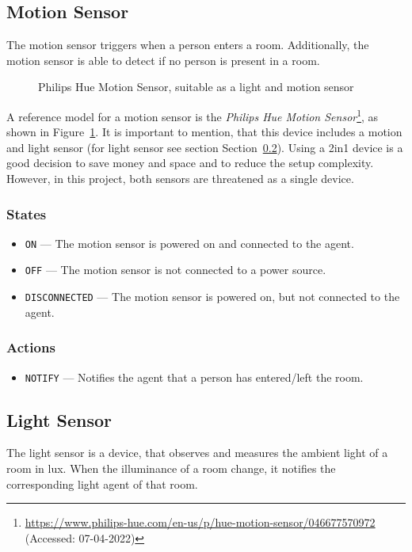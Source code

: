 \documentclass[letterpaper, 11pt]{Proposal}
\def\Sec#1{Section~\ref{#1}}
\def\Fig#1{Figure~\ref{#1}}
\begin{document}
\subsection{Motion Sensor}\label{subsec:03_devices_motion}
The motion sensor triggers when a person enters a room.
Additionally, the motion sensor is able to detect if no person
is present in a room.

\begin{figure}
    \centering
    \caption{Philips Hue Motion Sensor, suitable as a light and motion sensor}
    \label{fig:03_devices_motion_ref}
\end{figure}
A reference model for a motion sensor is the 
\textit{Philips Hue Motion Sensor}\footnote{\url{https://www.philips-hue.com/en-us/p/hue-motion-sensor/046677570972} (Accessed: 07-04-2022)}, 
as shown in \Fig{fig:03_devices_motion_ref}.
It is important to mention, that this device includes a motion and light sensor 
(for light sensor see section \Sec{subsec:03_devices_lightSensor}).
Using a 2in1 device is a good decision to save money and space 
and to reduce the setup complexity. However, in this project, both sensors are
threatened as a single device.

\subsubsection{States}
\begin{itemize}
    \item \texttt{ON} --- The motion sensor is powered on and connected to the agent.
    \item \texttt{OFF} --- The motion sensor is not connected to a power source.
    \item \texttt{DISCONNECTED} --- The motion sensor is powered on, but not connected to the agent.
\end{itemize}

\subsubsection{Actions}
\begin{itemize}
    \item \texttt{NOTIFY} --- Notifies the agent that a person has entered/left the room.
\end{itemize}

\subsection{Light Sensor}\label{subsec:03_devices_lightSensor}
The light sensor is a device, that observes and measures the ambient light of a 
room in lux.
When the illuminance of a room change, it notifies the corresponding 
light agent of that room.
\end{document}
